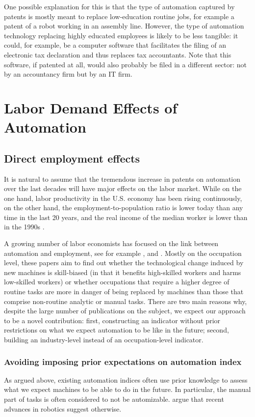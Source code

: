 \documentclass[11pt,a4paper]{article}
\begin{document}
One possible explanation for this is that the type of automation captured by patents is mostly meant to replace low-education routine jobs, for example a patent of a robot working in an assembly line. However, the type of automation technology replacing highly educated employees is likely to be less tangible: it could, for example, be a computer software that facilitates the filing of an electronic tax declaration and thus replaces tax accountants. Note that this software, if patented at all, would also probably be filed in a different sector: not by an accountancy firm but by an IT firm.



\section{Labor Demand Effects of Automation}

\subsection{Direct employment effects}
It is natural to assume that the tremendous increase in patents on automation over the last decades will have major effects on the labor market. While on the one hand, labor productivity in the U.S. economy has been rising continuously, on the other hand, the employment-to-population ratio is lower today than any time in the last 20 years, and the real income of the median worker is lower than in the 1990s \citep[p.~164]{BM2014}. 

A growing number of labor economists has focused on the link between automation and employment, see for example \cite{ALM2003}, \cite{GM2007} and \cite{AKK2008}. Mostly on the occupation level, these papers aim to find out whether the technological change induced by new machines is skill-biased (in that it benefits high-skilled workers and harms low-skilled workers) or whether occupations that require a higher degree of routine tasks are more in danger of being replaced by machines than those that comprise non-routine analytic or manual tasks. There are two main reasons why, despite the large number of publications on the subject, we expect our approach to be a novel contribution: first, constructing an indicator without prior restrictions on what we expect automation to be like in the future; second, building an industry-level instead of an occupation-level indicator.

\subsubsection*{Avoiding imposing prior expectations on automation index}
As argued above, existing automation indices often use prior knowledge to assess what we expect machines to be able to do in the future. In particular, the manual part of tasks is often considered to not be automizable. \cite{BM2014} argue that recent advances in robotics suggest otherwise. 
\end{document}
